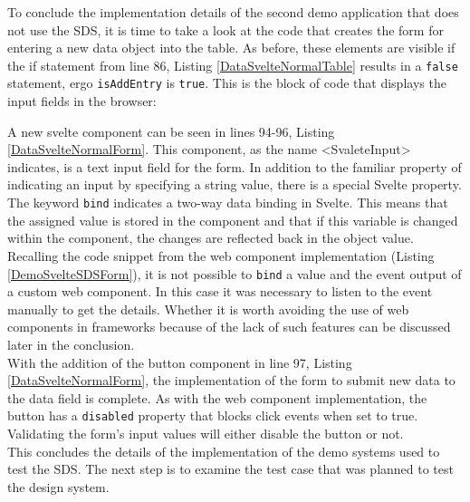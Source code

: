 To conclude the implementation details of the second demo application that does not use the SDS, it is time to take a look at the code that creates the form for entering a new data object into the table. As before, these elements are visible if the if statement from line 86, Listing \ref{DataSvelteNormalTable} results in a \texttt{false} statement, ergo \texttt{isAddEntry} is \texttt{true}. This is the block of code that displays the input fields in the browser:

A new svelte component can be seen in lines 94-96, Listing \ref{DataSvelteNormalForm}. This component, as the name <SvaleteInput> indicates, is a text input field for the form. In addition to the familiar property of indicating an input by specifying a string value, there is a special Svelte property. The keyword \texttt{bind} indicates a two-way data binding in Svelte. This means that the assigned value is stored in the component and that if this variable is changed within the component, the changes are reflected back in the object value.\\  
Recalling the code snippet from the web component implementation (Listing \ref{DemoSvelteSDSForm}), it is not possible to \texttt{bind} a value and the event output of a custom web component. In this case it was necessary to listen to the event manually to get the details. Whether it is worth avoiding the use of web components in frameworks because of the lack of such features can be discussed later in the conclusion. \\
With the addition of the button component in line 97, Listing \ref{DataSvelteNormalForm}, the implementation of the form to submit new data to the data field is complete. As with the web component implementation, the button has a \texttt{disabled} property that blocks click events when set to true. Validating the form's input values will either disable the button or not. \\


This concludes the details of the implementation of the demo systems used to test the SDS. The next step is to examine the test case that was planned to test the design system.
